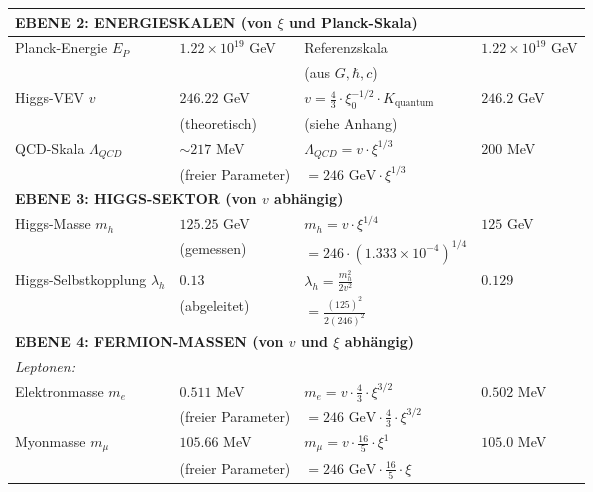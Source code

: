 \documentclass[12pt,a4paper]{article}
\theoremstyle{definition}
\begin{document}
\begin{longtable}{p{5cm}p{4cm}p{3.5cm}p{3.5cm}}
	\midrule
	\multicolumn{4}{l}{\textbf{EBENE 2: ENERGIESKALEN (von $\xi$ und Planck-Skala)}} \\
	\midrule
	
	Planck-Energie $E_P$ & $1.22 \times 10^{19}$ GeV & Referenzskala & $1.22 \times 10^{19}$ GeV \\
	& & (aus $G, \hbar, c$) & \\[0.3em]
	
Higgs-VEV $v$ & $246.22$ GeV & $v = \frac{4}{3} \cdot \xi_0^{-1/2} \cdot K_{\text{quantum}}$ & $246.2$ GeV \\
& (theoretisch) & (siehe Anhang) & \\[0.3em]

	
	QCD-Skala $\Lambda_{QCD}$ & $\sim 217$ MeV & $\Lambda_{QCD} = v \cdot \xi^{1/3}$ & $200$ MeV \\
	& (freier Parameter) & $= 246 \text{ GeV} \cdot \xi^{1/3}$ & \\[0.3em]
	
	\midrule
	\multicolumn{4}{l}{\textbf{EBENE 3: HIGGS-SEKTOR (von $v$ abhängig)}} \\
	\midrule
	
	Higgs-Masse $m_h$ & $125.25$ GeV & $m_h = v \cdot \xi^{1/4}$ & $125$ GeV \\
	& (gemessen) & $= 246 \cdot (1.333 \times 10^{-4})^{1/4}$ & \\[0.3em]
	
	Higgs-Selbstkopplung $\lambda_h$ & $0.13$ & $\lambda_h = \frac{m_h^2}{2v^2}$ & $0.129$ \\
	& (abgeleitet) & $= \frac{(125)^2}{2(246)^2}$ & \\[0.3em]
	
	\midrule
	\multicolumn{4}{l}{\textbf{EBENE 4: FERMION-MASSEN (von $v$ und $\xi$ abhängig)}} \\
	\midrule
	
	\multicolumn{4}{l}{\textit{Leptonen:}} \\
	
	Elektronmasse $m_e$ & $0.511$ MeV & $m_e = v \cdot \frac{4}{3} \cdot \xi^{3/2}$ & $0.502$ MeV \\
	& (freier Parameter) & $= 246 \text{ GeV} \cdot \frac{4}{3} \cdot \xi^{3/2}$ & \\[0.3em]
	
	Myonmasse $m_\mu$ & $105.66$ MeV & $m_\mu = v \cdot \frac{16}{5} \cdot \xi^1$ & $105.0$ MeV \\
	& (freier Parameter) & $= 246 \text{ GeV} \cdot \frac{16}{5} \cdot \xi$ & \\[0.3em]
	

\end{longtable}
\end{document}
